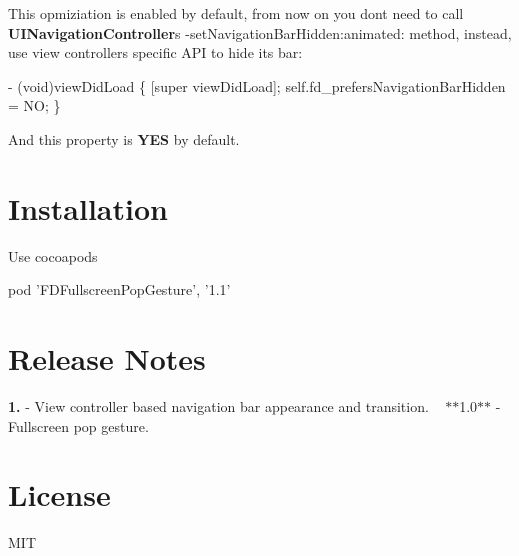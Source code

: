This opmiziation is enabled by default, from now on you don\textquotesingle{}t need to call {\bfseries U\+I\+Navigation\+Controller}\textquotesingle{}s {\ttfamily -\/set\+Navigation\+Bar\+Hidden\+:animated\+:} method, instead, use view controller\textquotesingle{}s specific A\+PI to hide its bar\+: ~\newline
 
\begin{DoxyCode}
- (void)viewDidLoad \{
    [super viewDidLoad];
    self.fd\_prefersNavigationBarHidden = NO;
\}
\end{DoxyCode}


And this property is {\bfseries Y\+ES} by default.

\section*{Installation}

Use cocoapods ~\newline
 
\begin{DoxyCode}
pod 'FDFullscreenPopGesture', '1.1'
\end{DoxyCode}
 \section*{Release Notes}

{\bfseries 1.} -\/ View controller based navigation bar appearance and transition. ~\newline
$\ast$$\ast$1.0$\ast$$\ast$ -\/ Fullscreen pop gesture. ~\newline
 \section*{License}

M\+IT 